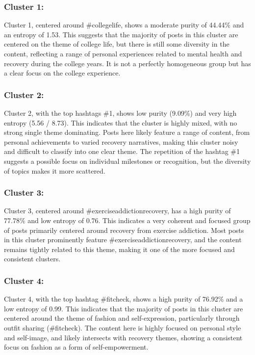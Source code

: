\documentclass[
]{article}
\begin{document}
\subsubsection{Cluster 1:}\label{cluster-1}

Cluster 1, centered around \#collegelife, shows a moderate purity of
44.44\% and an entropy of 1.53. This suggests that the majority of posts
in this cluster are centered on the theme of college life, but there is
still some diversity in the content, reflecting a range of personal
experiences related to mental health and recovery during the college
years. It is not a perfectly homogeneous group but has a clear focus on
the college experience.

\subsubsection{Cluster 2:}\label{cluster-2}

Cluster 2, with the top hashtags \#1, shows low purity (9.09\%) and very
high entropy (5.56 / 8.73). This indicates that the cluster is highly
mixed, with no strong single theme dominating. Posts here likely feature
a range of content, from personal achievements to varied recovery
narratives, making this cluster noisy and difficult to classify into one
clear theme. The repetition of the hashtag \#1 suggests a possible focus
on individual milestones or recognition, but the diversity of topics
makes it more scattered.

\subsubsection{Cluster 3:}\label{cluster-3}

Cluster 3, centered around \#exerciseaddictionrecovery, has a high
purity of 77.78\% and low entropy of 0.76. This indicates a very
coherent and focused group of posts primarily centered around recovery
from exercise addiction. Most posts in this cluster prominently feature
\#exerciseaddictionrecovery, and the content remains tightly related to
this theme, making it one of the more focused and consistent clusters.

\subsubsection{Cluster 4:}\label{cluster-4}

Cluster 4, with the top hashtag \#fitcheck, shows a high purity of
76.92\% and a low entropy of 0.99. This indicates that the majority of
posts in this cluster are centered around the theme of fashion and
self-expression, particularly through outfit sharing (\#fitcheck). The
content here is highly focused on personal style and self-image, and
likely intersects with recovery themes, showing a consistent focus on
fashion as a form of self-empowerment.
\end{document}
